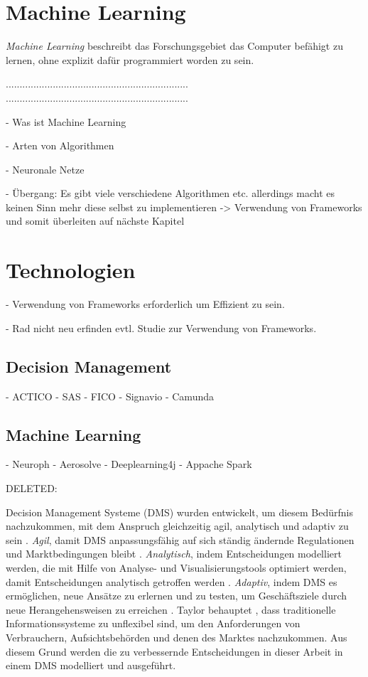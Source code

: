           
\section{Machine Learning}
\label{sec:Machine_Learning2}

\emph{Machine Learning} beschreibt das Forschungsgebiet das Computer befähigt zu lernen, ohne explizit dafür programmiert worden zu sein. 



..................................................................
..................................................................

- Was ist Machine Learning

- Arten von Algorithmen 

- Neuronale Netze 

- Übergang: Es gibt viele verschiedene Algorithmen etc. allerdings macht es keinen Sinn mehr diese selbst zu implementieren -> Verwendung von Frameworks und somit überleiten auf nächste Kapitel

\section{Technologien}
\label{sec:Technologien2}

- Verwendung von Frameworks erforderlich um Effizient zu sein.

- Rad nicht neu erfinden evtl. Studie zur Verwendung von Frameworks.

\subsection{Decision Management}
\label{subsec:Decision_Management2}

- ACTICO 
- SAS
- FICO 
- Signavio
- Camunda

\subsection{Machine Learning}
\label{subsec:Machine_Learning2}

- Neuroph
- Aerosolve 
- Deeplearning4j
- Appache Spark

DELETED:

Decision Management Systeme (DMS) wurden entwickelt, um diesem Bedürfnis nachzukommen, mit dem Anspruch gleichzeitig agil, analytisch und adaptiv zu sein \cite[vgl. S. 1]{JT12}. \textit{Agil}, damit DMS anpassungsfähig auf sich ständig ändernde Regulationen und Marktbedingungen bleibt \cite[vgl. S. 4]{JT11}. \textit{Analytisch}, indem Entscheidungen modelliert werden, die mit Hilfe von Analyse- und Visualisierungstools optimiert werden, damit Entscheidungen analytisch getroffen werden \cite[vgl. S. 8]{JT11}. \textit{Adaptiv}, indem DMS es ermöglichen, neue Ansätze zu erlernen und zu testen, um Geschäftsziele durch neue Herangehensweisen zu erreichen \cite[vgl. S. 15]{JT11}. Taylor behauptet \cite[vgl. S. 1]{JT12}, dass traditionelle Informationssysteme zu unflexibel sind, um den Anforderungen von Verbrauchern, Aufsichtsbehörden und denen des Marktes nachzukommen. Aus diesem Grund werden die zu verbessernde Entscheidungen in dieser Arbeit in einem DMS modelliert und ausgeführt. 

